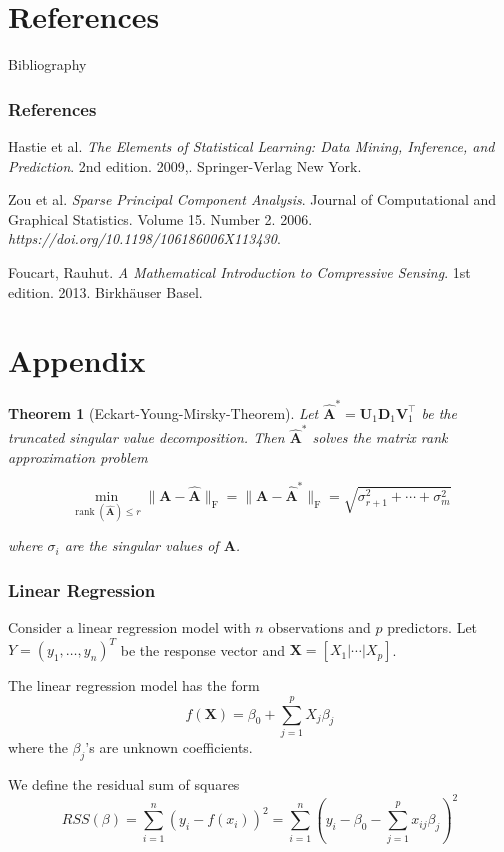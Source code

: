 \documentclass{beamer}
\theoremstyle{plain}
\newtheorem{thm}{Theorem}
\theoremstyle{definition}
\newcommand{\mat}[1]{\mathbf{#1}}
\begin{document}
\section{References}

\begin{frame}{Bibliography}
\frametitle{References}
\begin{thebibliography}{9}

  Hastie et al.
  \textit{The Elements of Statistical Learning: Data Mining, Inference, and Prediction}.
  2nd edition. 
  2009,.
  Springer-Verlag New York.
  
 Zou et al.
  \textit{Sparse Principal Component Analysis}.
  Journal of Computational and Graphical Statistics.
  Volume 15.
  Number 2.
  2006.
  \textit{https://doi.org/10.1198/106186006X113430}.
  
 Foucart, Rauhut.
 \textit{A Mathematical Introduction to Compressive Sensing}.
 1st edition.
 2013.
 Birkh{\"a}user Basel.

\end{thebibliography}


\end{frame}



\section{Appendix}

\begin{frame}
\begin{thm}[Eckart-Young-Mirsky-Theorem]
Let $\widehat{\mat{A}}^* = \mat{U}_1 \mat{D}_1 \mat{V}_1^{\top}$
be the \textit{truncated singular value decomposition}. Then $\widehat{ \mat{A}}^*$ solves the matrix rank approximation problem

$$\min_{\operatorname{rank}(\widehat{\mat{A}}) \leq r} \|\mat{A}-\widehat{\mat{A}}\|_{\text{F}} = \|\mat{A}-\widehat{\mat{A}}^*\|_{\text{F}} = \sqrt{\sigma^2_{r+1} + \cdots + \sigma^2_m}$$

where $\sigma_i$ are the singular values of $\mat A$.
\end{thm}
\end{frame}

\begin{frame}
\frametitle{Linear Regression}
Consider a linear regression model with $n$ observations and $p$ predictors. Let $Y = (y_1, \ldots , y_n)^T$ be the response vector and $\mat X = \left[X_1 \vert \cdots \vert X_p \right]$.\linebreak

The linear regression model has the form
$$f(\mat X) = \beta_0 + \sum_{j=1}^p X_j\beta_j$$
where the $\beta_j$'s are unknown coefficients.

We define the residual sum of squares
$$RSS(\beta) = \sum_{i=1}^n (y_i - f(x_i))^2 = \sum_{i=1}^n (y_i - \beta_0 - \sum_{j=1}^p x_{ij}\beta_j)^2$$
\end{frame}
\end{document}
